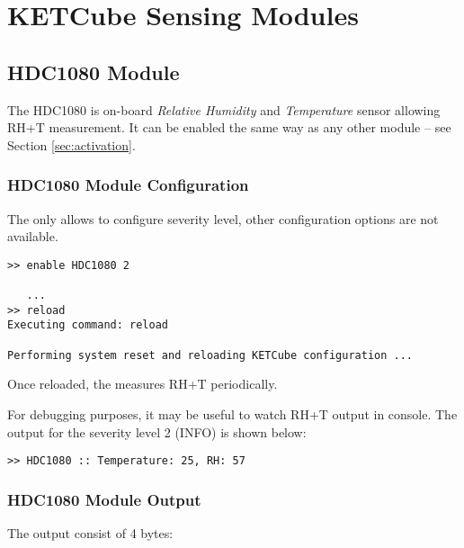 \clearpage
\section{KETCube Sensing Modules}

\subsection{HDC1080 Module}

The HDC1080 is on-board {\it Relative Humidity} and {\it Temperature} sensor allowing RH+T measurement. It can be enabled the same way as any other module -- see Section \ref{sec:activation}.

\subsubsection{HDC1080 Module Configuration}
  The  only allows to configure severity level, other configuration options are not available.
  
\begin{docCodeExample}
\begin{verbatim}
>> enable HDC1080 2

   ...
>> reload
Executing command: reload

Performing system reset and reloading KETCube configuration ...  
\end{verbatim}
\end{docCodeExample}
  
  Once reloaded, the  measures RH+T periodically. 
  
  For debugging purposes, it may be useful to watch RH+T output in console. The output for the severity level 2 (INFO) is shown below:

\begin{docCodeExample}
\begin{verbatim}
>> HDC1080 :: Temperature: 25, RH: 57
\end{verbatim}
\end{docCodeExample}

\subsubsection{HDC1080 Module Output}
  The  output consist of 4 bytes:
  

